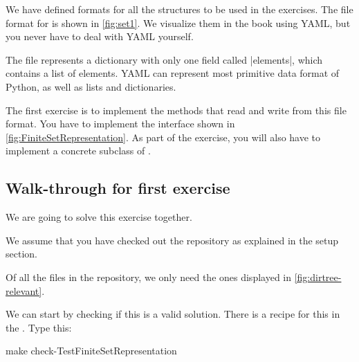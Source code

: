 We have defined formats for all the structures to be used in the exercises.
The file format for \FiniteSet is shown in \cref{fig:set1}.
We visualize them in the book using YAML, but you never have to deal with YAML yourself.



The file represents a dictionary with only one field called \pystr|elements|, which contains a list of elements.
YAML can represent most primitive data format of Python, as well as lists and dictionaries.

\begin{gradedexercise}
  \label{ex:setrepr}
  The first exercise is to implement the methods that read and write from this file format.
  You have to implement the  interface 
  shown in \cref{fig:FiniteSetRepresentation}.
   As part of the exercise, you will also  have to implement a concrete subclass of \FiniteSet.
\end{gradedexercise}
\begin{longcode}
\caption{}
\label{fig:FiniteSetRepresentation}
\end{longcode}

%

\subsection{Walk-through for first exercise}

We are going to solve this exercise together.

We assume that you have checked out the repository as explained in the setup section.

Of all the files in the repository, we only need the ones displayed in \cref{fig:dirtree-relevant}.
%
%


We can start by checking if this is a valid solution.
There is a recipe for this in the .
Type this:

\begin{console}
 make check-TestFiniteSetRepresentation
\end{console}

